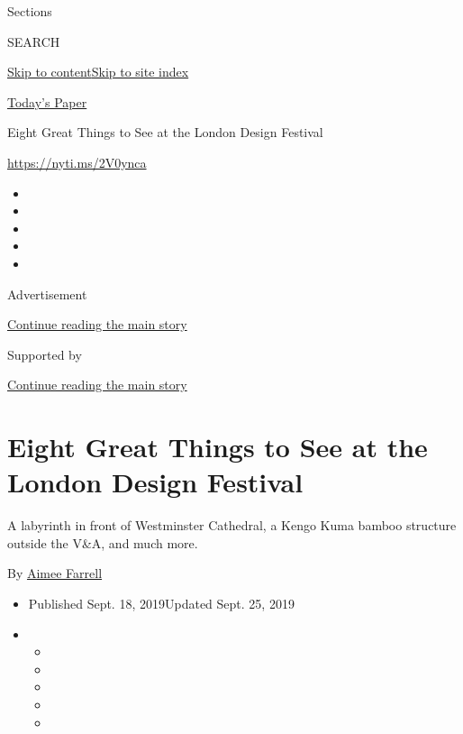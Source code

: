 Sections

SEARCH

\protect\hyperlink{site-content}{Skip to
content}\protect\hyperlink{site-index}{Skip to site index}

\href{https://myaccount.nytimes3xbfgragh.onion/auth/login?response_type=cookie\&client_id=vi}{}

\href{https://www.nytimes3xbfgragh.onion/section/todayspaper}{Today's
Paper}

Eight Great Things to See at the London Design Festival

\url{https://nyti.ms/2V0ynca}

\begin{itemize}
\item
\item
\item
\item
\item
\end{itemize}

Advertisement

\protect\hyperlink{after-top}{Continue reading the main story}

Supported by

\protect\hyperlink{after-sponsor}{Continue reading the main story}

\hypertarget{eight-great-things-to-see-at-the-london-design-festival}{%
\section{Eight Great Things to See at the London Design
Festival}\label{eight-great-things-to-see-at-the-london-design-festival}}

A labyrinth in front of Westminster Cathedral, a Kengo Kuma bamboo
structure outside the V\&A, and much more.

By \href{https://www.nytimes3xbfgragh.onion/by/aimee-farrell}{Aimee
Farrell}

\begin{itemize}
\item
  Published Sept. 18, 2019Updated Sept. 25, 2019
\item
  \begin{itemize}
  \item
  \item
  \item
  \item
  \item
  \end{itemize}
\end{itemize}

